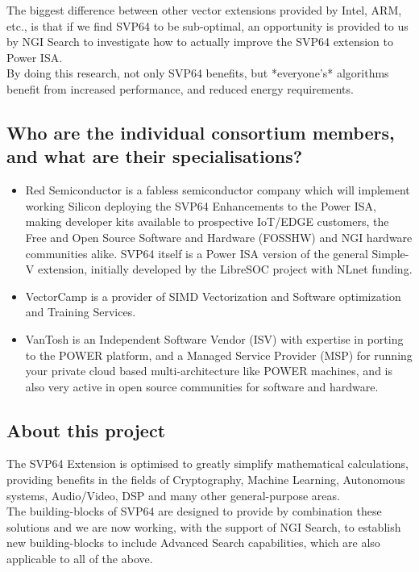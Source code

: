 The biggest difference between other vector extensions provided by Intel,
ARM, etc., is that if we find SVP64 to be sub-optimal, an opportunity is
provided to us by NGI Search to investigate how to actually improve the
SVP64 extension to Power ISA.\\

By doing this research, not only SVP64 benefits, but *everyone's* algorithms
benefit from increased performance, and reduced energy requirements.\\

\subsection{Who are the individual consortium members, and what are their specialisations?}

\begin{itemize}
  \item Red Semiconductor is a fabless semiconductor company which will implement
  working Silicon deploying the SVP64 Enhancements to the Power ISA, making
  developer kits available to prospective IoT/EDGE customers, the Free and
  Open Source Software and Hardware (FOSSHW) and NGI hardware communities
  alike. SVP64 itself is a Power ISA version of the general Simple-V
  extension, initially developed by the LibreSOC project with NLnet funding.
  \item VectorCamp is a provider of SIMD Vectorization and Software optimization
  and Training Services.
  \item VanTosh is an Independent Software Vendor (ISV) with expertise in porting
  to the POWER platform, and a Managed Service Provider (MSP) for running
  your private cloud based multi-architecture like POWER machines, and is
  also very active in open source communities for software and hardware.
\end{itemize}

\subsection{About this project}

The SVP64 Extension is optimised to greatly simplify mathematical calculations,
providing benefits in the fields of Cryptography, Machine Learning,
Autonomous systems, Audio/Video, DSP and many other general-purpose areas.\\
 
The building-blocks of SVP64 are designed to provide by combination these
solutions and we are now working, with the support of NGI Search, to
establish new building-blocks to include Advanced Search capabilities,
which are also applicable to all of the above.\\

